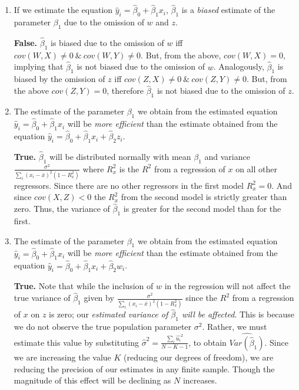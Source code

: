 \documentclass[12pt]{article}
\begin{document}
\vspace{4mm} 

\begin{enumerate}
\item If we estimate the equation $\hat{y}_i = \hat{\beta}_0 + \hat{\beta}_1 x_i$, $\hat{\beta}_1$ is a \emph{biased} estimate of the parameter $\beta_1$ due to the omission of $w$ and $z$.

\vspace{4mm} 

    \textbf{False.}  $\hat{\beta}_1$ is biased due to the omission of $w$ iff $cov(W,X) \neq 0 ~\&~ cov(W,Y) \neq 0$.  But, from the above, $cov(W,X) = 0$, implying that $\hat{\beta}_1$ is not biased due to the omission of $w$.  Analogously, $\hat{\beta}_1$ is biased by the omission of $z$ iff $cov(Z,X) \neq 0 ~\&~ cov(Z,Y) \neq 0$.  But, from the above $cov(Z,Y) = 0$, therefore $\hat{\beta}_1$ is not biased due to the omission of $z$.

\item The estimate of the parameter $\beta_1$ we obtain from the estimated equation $\hat{y}_i = \hat{\beta}_0 + \hat{\beta}_1 x_i$ will be \emph{more efficient} than the estimate obtained from the equation $\hat{y}_i = \hat{\beta}_0 + \hat{\beta}_1 x_i + \hat{\beta}_2 z_i$.

\vspace{4mm} 

    \textbf{True.}  $\hat{\beta}_1$ will be distributed normally with mean $\beta_1$ and variance $\frac{\sigma^2}{\sum_i(x_i-\bar{x})^2 (1-R^2_x)}$ where $R^2_x$ is the $R^2$ from a regression of $x$ on all other regressors.  Since there are no other regressors in the first model $R^2_x =0$.  And since $cov(X,Z)<0$ the $R^2_x$ from the second model is strictly greater than zero.  Thus, the variance of $\hat{\beta}_1$ is greater for the second model than for the first.

\vspace{4mm} 

\item The estimate of the parameter $\beta_1$ we obtain from the estimated equation $\hat{y}_i = \hat{\beta}_0 + \hat{\beta}_1 x_i$ will be \emph{more efficient} than the estimate obtained from the equation $\hat{y}_i = \hat{\beta}_0 + \hat{\beta}_1 x_i + \hat{\beta}_2 w_i$.

\vspace{4mm} 

    \textbf{True.}  Note that while the inclusion of $w$ in the regression will not affect the true variance of $\hat{\beta}_1$ given by $\frac{\sigma^2}{\sum_i(x_i-\bar{x})^2 (1-R^2_x)}$ since the $R^2$ from a regression of $x$ on $z$ is zero; our \emph{estimated variance of $\hat{\beta}_1$ will be affected}.  This is because we do not observe the true population parameter $\sigma^2$.  Rather, we must estimate this value by substituting $\hat{\sigma}^2 = \frac{\sum_i \hat{u_i}^2}{N-K-1}$, to obtain $\widehat{Var(\hat{\beta}_1)}$.  Since we are increasing the value $K$ (reducing our degrees of freedom), we are reducing the precision of our estimates in any finite sample.  Though the magnitude of this effect will be declining as $N$ increases.
\end{enumerate}
\end{document}
